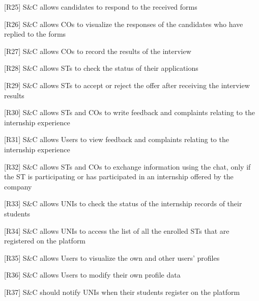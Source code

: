 [R25] S\&C allows candidates to respond to the received forms

[R26] S\&C allows COs to visualize the responses of the candidates who have replied to the forms

[R27] S\&C allows COs to record the results of the interview

[R28] S\&C allows STs to check the status of their applications

[R29] S\&C allows STs to accept or reject the offer after receiving the interview results

[R30] S\&C allows STs and COs to write feedback and complaints relating to the internship experience

[R31] S\&C allows Users to view feedback and complaints relating to the internship experience

[R32] S\&C allows STs and COs to exchange information using the chat, only if the ST is participating or has participated in an internship offered by the company

[R33] S\&C allows UNIs to check the status of the internship records of their students

[R34] S\&C allows UNIs to access the list of all the enrolled STs that are registered on the platform

[R35] S\&C allows Users to visualize the own and other users' profiles

[R36] S\&C allows Users to modify their own profile data

[R37] S\&C should notify UNIs when their students register on the platform


